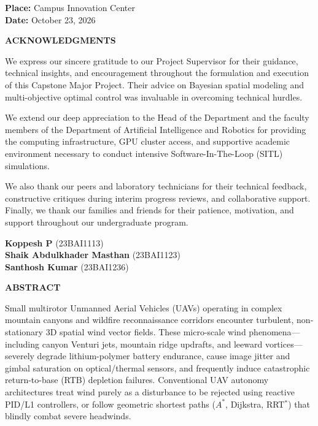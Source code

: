 \documentclass[12pt,a4paper,oneside]{report}
\begin{document}
\vfill
\noindent
\textbf{Place:} Campus Innovation Center\\
\textbf{Date:} October 23, 2026

\newpage
\thispagestyle{plain}
\begin{center}
    \vspace*{5mm}
    {\LARGE \textbf{ACKNOWLEDGMENTS}}\\[8mm]
\end{center}

We express our sincere gratitude to our Project Supervisor for their guidance, technical insights, and encouragement throughout the formulation and execution of this Capstone Major Project. Their advice on Bayesian spatial modeling and multi-objective optimal control was invaluable in overcoming technical hurdles.

We extend our deep appreciation to the Head of the Department and the faculty members of the Department of Artificial Intelligence and Robotics for providing the computing infrastructure, GPU cluster access, and supportive academic environment necessary to conduct intensive Software-In-The-Loop (SITL) simulations.

We also thank our peers and laboratory technicians for their technical feedback, constructive critiques during interim progress reviews, and collaborative support. Finally, we thank our families and friends for their patience, motivation, and support throughout our undergraduate program.

\vspace{15mm}
\noindent
\textbf{Koppesh P} \hfill (23BAI1113)\\
\textbf{Shaik Abdulkhader Masthan} \hfill (23BAI1123)\\
\textbf{Santhosh Kumar} \hfill (23BAI1236)

\newpage
\thispagestyle{plain}
\begin{center}
    \vspace*{5mm}
    {\LARGE \textbf{ABSTRACT}}\\[8mm]
\end{center}

Small multirotor Unmanned Aerial Vehicles (UAVs) operating in complex mountain canyons and wildfire reconnaissance corridors encounter turbulent, non-stationary 3D spatial wind vector fields. These micro-scale wind phenomena---including canyon Venturi jets, mountain ridge updrafts, and leeward vortices---severely degrade lithium-polymer battery endurance, cause image jitter and gimbal saturation on optical/thermal sensors, and frequently induce catastrophic return-to-base (RTB) depletion failures. Conventional UAV autonomy architectures treat wind purely as a disturbance to be rejected using reactive PID/L1 controllers, or follow geometric shortest paths ($A^*$, Dijkstra, RRT$^*$) that blindly combat severe headwinds.
\end{document}
